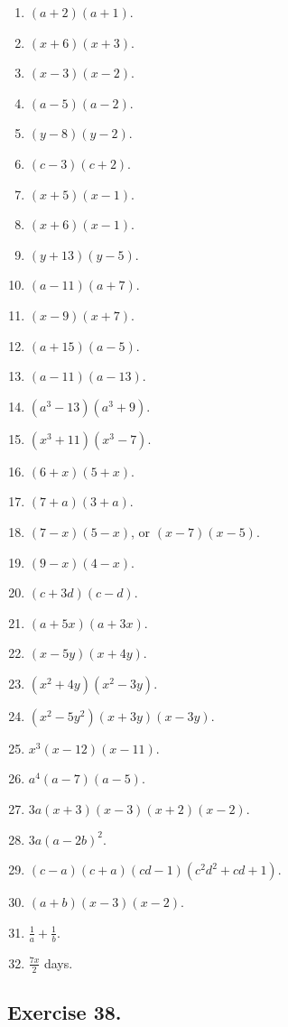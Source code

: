 \documentclass{book}
\begin{document}
\begin{enumerate}
\item $(a+2)(a+1)$.
\item $(x+6)(x+3)$.
\item $(x-3)(x-2)$.
\item $(a-5)(a-2)$.
\item $(y-8)(y-2)$.
\item $(c-3)(c+2)$.
\item $(x+5)(x-1)$.
\item $(x+6)(x-1)$.
\item $(y+13)(y-5)$.
\item $(a-11)(a+7)$.
\item $(x-9)(x+7)$.
\item $(a+15)(a-5)$.
\item $(a-11)(a-13)$.
\item $(a^3-13)(a^3+9)$.
\item $(x^3+11)(x^3-7)$.
\item $(6+x)(5+x)$.
\item $(7+a)(3+a)$.
\item $(7-x)(5-x)$, or $(x-7)(x-5)$.
\item $(9-x)(4-x)$.
\item $(c+3d)(c-d)$.
\item $(a+5x)(a+3x)$.
\item $(x-5y)(x+4y)$.
\item $(x^2+4y)(x^2-3y)$.
\item $(x^2-5y^2)(x+3y)(x-3y)$.
\item $x^3(x-12)(x-11)$.
\item $a^4(a-7)(a-5)$.
\item $3a(x+3)(x-3)(x+2)(x-2)$.
\item $3a\left(a-2b\right)^2$.
\item $(c-a)(c+a)(cd-1)(c^2d^2+cd+1)$.
\item $(a+b)(x-3)(x-2)$.
\item $\frac{1}{a}+\frac{1}{b}$.
\item $\frac{7x}{2}$ days.
\end{enumerate}


\subsection*{Exercise 38.}
\end{document}
